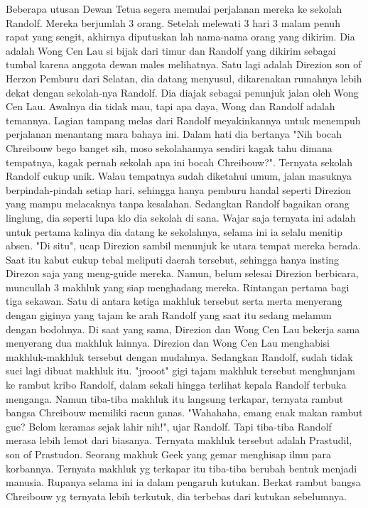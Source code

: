 \documentclass[a4paper,11pt,final]{article}
\begin{document}
Beberapa utusan Dewan Tetua segera memulai perjalanan mereka ke sekolah Randolf. Mereka berjumlah 3 orang.
Setelah melewati 3 hari 3 malam penuh rapat yang sengit, akhirnya diputuskan lah nama-nama orang yang dikirim. Dia adalah Wong Cen Lau si bijak dari timur dan Randolf yang dikirim sebagai tumbal karena anggota dewan males melihatnya.
Satu lagi adalah Direzion son of Herzon Pemburu dari Selatan, dia datang menyusul, dikarenakan rumahnya lebih dekat dengan sekolah-nya Randolf.
Dia diajak sebagai penunjuk jalan oleh Wong Cen Lau. Awalnya dia tidak mau, tapi apa daya, Wong dan Randolf adalah temannya. Lagian tampang melas dari Randolf meyakinkannya untuk menempuh perjalanan menantang mara bahaya ini.
Dalam hati dia bertanya "Nih bocah Chreibouw bego banget sih, moso sekolahannya sendiri kagak tahu dimana tempatnya, kagak pernah sekolah apa ini bocah Chreibouw?".
Ternyata sekolah Randolf cukup unik. Walau tempatnya sudah diketahui umum, jalan masuknya berpindah-pindah setiap hari, sehingga hanya pemburu handal seperti Direzion yang mampu melacaknya tanpa kesalahan.
Sedangkan Randolf bagaikan orang linglung, dia seperti lupa klo dia sekolah di sana. Wajar saja ternyata ini adalah untuk pertama kalinya dia datang ke sekolahnya, selama ini ia selalu menitip absen.
"Di situ", ucap Direzion sambil menunjuk ke utara tempat mereka berada. Saat itu kabut cukup tebal meliputi daerah tersebut, sehingga hanya insting Direzon saja yang meng-guide mereka.
Namun, belum selesai Direzion berbicara, muncullah 3 makhluk yang siap menghadang mereka. Rintangan pertama bagi tiga sekawan.
Satu di antara ketiga makhluk tersebut serta merta menyerang dengan giginya yang tajam ke arah Randolf yang saat itu sedang melamun dengan bodohnya.
Di saat yang sama, Direzion dan Wong Cen Lau bekerja sama menyerang dua makhluk lainnya.
Direzion dan Wong Cen Lau menghabisi makhluk-makhluk tersebut dengan mudahnya. Sedangkan Randolf, sudah tidak suci lagi dibuat makhluk itu.
"jrooot" gigi tajam makhluk tersebut menghunjam ke rambut kribo Randolf, dalam sekali hingga terlihat kepala Randolf terbuka menganga. Namun tiba-tiba makhluk itu langsung terkapar, ternyata rambut bangsa Chreibouw memiliki racun ganas.
"Wahahaha, emang enak makan rambut gue? Belom keramas sejak lahir nih!", ujar Randolf.
Tapi tiba-tiba Randolf merasa lebih lemot dari biasanya. Ternyata makhluk tersebut adalah Prastudil, son of Prastudon. Seorang makhuk Geek yang gemar menghisap ilmu para korbannya.
Ternyata makhluk yg terkapar itu tiba-tiba berubah bentuk menjadi manusia. Rupanya selama ini ia dalam pengaruh kutukan. Berkat rambut bangsa Chreibouw yg ternyata lebih terkutuk, dia terbebas dari kutukan sebelumnya.
\end{document}

